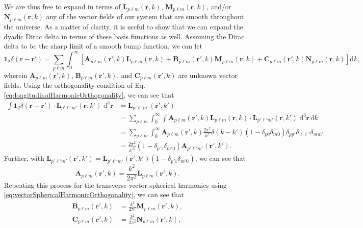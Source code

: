 We are thus free to expand in terms of $\mathbf{L}_{p\ell m}(\mathbf{r},k)$, $\mathbf{M}_{p\ell m}(\mathbf{r},k)$, and/or $\mathbf{N}_{p\ell m}(\mathbf{r},k)$ any of the vector fields of our system that are smooth throughout the universe. As a matter of clarity, it is useful to show that we can expand the dyadic Dirac delta in terms of these basis functions as well. Assuming the Dirac delta to be the sharp limit of a smooth bump function, we can let 
\begin{equation}
\bm{1}_2\delta(\mathbf{r} - \mathbf{r}') = \sum_{p\ell m}\int_0^\infty\left[\mathbf{A}_{p\ell m}(\mathbf{r}',k)\mathbf{L}_{p\ell m}(\mathbf{r},k) + \mathbf{B}_{p\ell m}(\mathbf{r}',k)\mathbf{M}_{p\ell m}(\mathbf{r},k) + \mathbf{C}_{p\ell m}(\mathbf{r}',k)\mathbf{N}_{p\ell m}(\mathbf{r},k)\right]\mathrm{d}k,
\end{equation}
wherein $\mathbf{A}_{p\ell m}(\mathbf{r}',k)$, $\mathbf{B}_{p\ell m}(\mathbf{r}',k)$, and $\mathbf{C}_{p\ell m}(\mathbf{r}',k)$ are unknown vector fields. Using the orthogonality condition of Eq. \eqref{eq:longitudinalHarmonicOrthogonality}, we can see that
\begin{equation}
\begin{split}
\int\bm{1}_2\delta(\mathbf{r} - \mathbf{r}')\cdot\mathbf{L}_{p'\ell'm'}(\mathbf{r},k')\;\mathrm{d}^3\mathbf{r} &= \mathbf{L}_{p'\ell'm'}(\mathbf{r}',k')\\
&= \sum_{p\ell m}\int_0^\infty\int\mathbf{A}_{p\ell m}(\mathbf{r}',k)\mathbf{L}_{p\ell m}(\mathbf{r},k)\cdot\mathbf{L}_{p'\ell'm'}(\mathbf{r},k')\;\mathrm{d}^3\mathbf{r}\,\mathrm{d}k\\
&= \sum_{p\ell m}\int_0^\infty\mathbf{A}_{p\ell m}(\mathbf{r}',k)\frac{2\pi^2}{k^2}\delta(k - k')(1 - \delta_{p0}\delta_{m0})\delta_{pp'}\delta_{\ell\ell'}\delta_{mm'}\\
&= \frac{2\pi^2}{k'^2}(1 - \delta_{p'1}\delta_{m'0})\mathbf{A}_{p'\ell'm'}(\mathbf{r}',k').
\end{split}
\end{equation}
Further, with $\mathbf{L}_{p'\ell'm'}(\mathbf{r}',k') = \mathbf{L}_{p'\ell'm'}(\mathbf{r}',k')(1 - \delta_{p'1}\delta_{m'0})$, we can see that
\begin{equation}
\mathbf{A}_{p\ell m}(\mathbf{r}',k) = \frac{k^2}{2\pi^2}\mathbf{L}_{p\ell m}(\mathbf{r}',k).
\end{equation}
Repeating this process for the transverse vector spherical harmonics using \eqref{eq:vectorSphericalHarmonicOrthogonality}, we can see that
\begin{equation}
\begin{split}
\mathbf{B}_{p\ell m}(\mathbf{r}',k) &= \frac{k^2}{2\pi^2}\mathbf{M}_{p\ell m}(\mathbf{r}',k),\\
\mathbf{C}_{p\ell m}(\mathbf{r}',k) &= \frac{k^2}{2\pi^2}\mathbf{N}_{p\ell m}(\mathbf{r}',k),
\end{split}
\end{equation}
